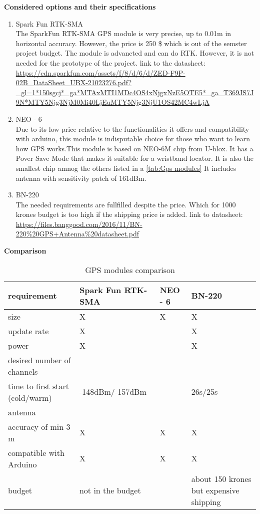 \textbf{Considered options and their specifications}
\begin{enumerate}
    \item Spark Fun RTK-SMA\\
    The SparkFun RTK-SMA GPS module is very precise, up to 0.01m in horizontal accuracy. However,
    the price is 250 \$ which is out of the semster project budget. The module is advancted and can do RTK. 
    However, it is not needed for the prototype of the project.
    link to the datasheet: \url{https://cdn.sparkfun.com/assets/f/8/d/6/d/ZED-F9P-02B_DataSheet_UBX-21023276.pdf?_gl=1*150sgcj*_ga*MTAxMTI1MDc4OS4xNjgxNzE5OTE5*_ga_T369JS7J9N*MTY5Njg3NjM0Mi40LjEuMTY5Njg3NjU1OS42MC4wLjA}
       
    \item NEO - 6\\
    Due to its low price relative to the functionalities it offers and compatibility with arduino, 
    this module is indisputable choice for those who want to learn how GPS works.This module is based on NEO-6M chip from U-blox. 
    It has a Pover Save Mode that makes it suitable for a wristband locator. It is also the smallest chip amnog the others listed in a  \autoref{tab:Gps modules}
    It includes antenna with sensitivity patch of 161dBm.
    \item BN-220\\
    The needed requirements are fullfilled despite the price. Which for 1000 krones budget is too high if the shipping price is added.
link to datasheet: \url{https://files.banggood.com/2016/11/BN-220%20GPS+Antenna%20datasheet.pdf} 
\cite{1}



\end{enumerate}


\textbf{Comparison}
\begin{center}
    \begin{table}[H]
    \begin{tabularx}{0.8\textwidth}{
    | >{\centering\arraybackslash}X 
    | >{\centering\arraybackslash}X 
    | >{\centering\arraybackslash}X  
    | >{\centering\arraybackslash}X | }

    \hline
    requirement&Spark Fun RTK-SMA&NEO - 6&BN-220 \\
    \hline
    size&X&X&X\\
    \hline
    update rate&X&&X\\
    \hline
    power&X&&X\\
    \hline
    desired number of channels&&&72\\
    \hline
    time to first start (cold/warm)&-148dBm/-157dBm&&26s/25s\\
    \hline
    antenna&&&\\
    \hline
    accuracy of min 3 m&X&X&X\\
    \hline
    compatible with Arduino&X&X&X\\
    \hline
    budget&not in the budget&&about 150 krones but expensive shipping\\
    \hline
\end{tabularx}
 \caption{GPS modules comparison }
        \label{tab:Gps modules}
\end{table}
\end{center}

